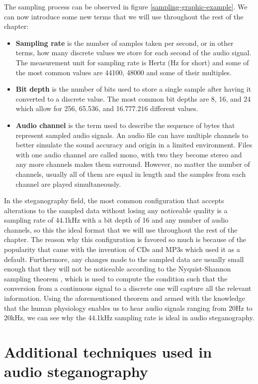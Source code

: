 The sampling process can be observed in figure \ref{sampling-graphic-example}. We can now introduce some new terms that we will use throughout the rest of the chapter:
\begin{itemize}
	\item \textbf{Sampling rate} is the number of samples taken per second, or in other terms, how many discrete values we store for each second of the audio signal. The measurement unit for sampling rate is Hertz (Hz for short) and some of the most common values are 44100, 48000 and some of their multiples.
	\item \textbf{Bit depth} is the number of bits used to store a single sample after having it converted to a discrete value. The most common bit depths are 8, 16, and 24 which allow for 256, 65.536, and 16.777.216 different values. 
	\item \textbf{Audio channel} is the term used to describe the sequence of bytes that represent sampled audio signals. An audio file can have multiple channels to better simulate the sound accuracy and origin in a limited environment. Files with one audio channel are called mono, with two they become stereo and any more channels makes them surround. However, no matter the number of channels, usually all of them are equal in length and the samples from each channel are played simultaneously.
\end{itemize}

In the steganography field, the most common configuration that accepts alterations to the sampled data without losing any noticeable quality is a sampling rate of 44.1kHz with a bit depth of 16 and any number of audio channels, so this the ideal format that we will use throughout the rest of the chapter. The reason why this configuration is favored so much is because of the popularity that came with the invention of CDs and MP3s which used it as a default. Furthermore, any changes made to the sampled data are usually small enough that they will not be noticeable according to the Nyquist-Shannon sampling theorem \cite{Shannon1949}, which is used to compute the condition such that the conversion from a continuous signal to a discrete one will capture all the relevant information. Using the aforementioned theorem and armed with the knowledge that the human physiology enables us to hear audio signals ranging from 20Hz to 20kHz, we can see why the 44.1kHz sampling rate is ideal in audio steganography.

\section{Additional techniques used in audio steganography}
